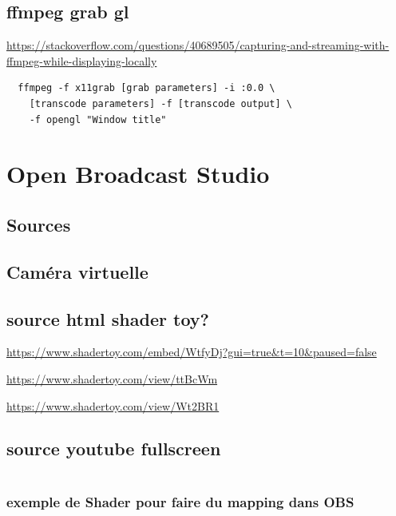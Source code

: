 \documentclass[
  french,
]{book}
\begin{document}
\hypertarget{ffmpeg-grab-gl}{%
\section{ffmpeg grab gl}\label{ffmpeg-grab-gl}}

\url{https://stackoverflow.com/questions/40689505/capturing-and-streaming-with-ffmpeg-while-displaying-locally}

\begin{verbatim}
  ffmpeg -f x11grab [grab parameters] -i :0.0 \
    [transcode parameters] -f [transcode output] \
    -f opengl "Window title"
\end{verbatim}

\hypertarget{obs}{%
\chapter{Open Broadcast Studio}\label{obs}}

\hypertarget{sources-1}{%
\section{Sources}\label{sources-1}}

\hypertarget{camuxe9ra-virtuelle-1}{%
\section{Caméra virtuelle}\label{camuxe9ra-virtuelle-1}}

\hypertarget{source-html-shader-toy}{%
\section{source html shader toy?}\label{source-html-shader-toy}}

\url{https://www.shadertoy.com/embed/WtfyDj?gui=true\&t=10\&paused=false}

\url{https://www.shadertoy.com/view/ttBcWm}

\url{https://www.shadertoy.com/view/Wt2BR1}

\hypertarget{source-youtube-fullscreen}{%
\section{source youtube fullscreen}\label{source-youtube-fullscreen}}

\begin{verbatim}
\end{verbatim}

\hypertarget{exemple-de-shader-pour-faire-du-mapping-dans-obs}{%
\subsection{exemple de Shader pour faire du mapping dans OBS}\label{exemple-de-shader-pour-faire-du-mapping-dans-obs}}
\end{document}
